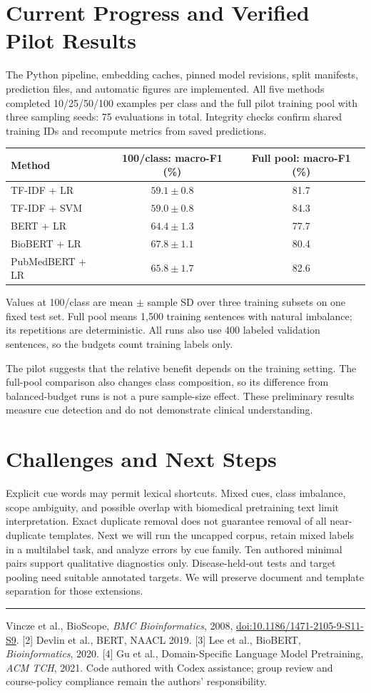 \documentclass[10pt,letterpaper]{article}
\begin{document}
\section{Current Progress and Verified Pilot Results}
The Python pipeline, embedding caches, pinned model revisions, split manifests,
prediction files, and automatic figures are implemented. All five methods completed
10/25/50/100 examples per class and the full pilot training pool with three sampling
seeds: 75 evaluations in total. Integrity checks confirm shared training IDs and
recompute metrics from saved predictions.
\begin{center}
\small
\begin{tabular}{lcc}
\toprule
Method & 100/class: macro-F1 (\%) & Full pool: macro-F1 (\%)\\
\midrule
TF-IDF + LR & $59.1\pm0.8$ & 81.7 \\
TF-IDF + SVM & $59.0\pm0.8$ & 84.3 \\
BERT + LR & $64.4\pm1.3$ & 77.7 \\
BioBERT + LR & $67.8\pm1.1$ & 80.4 \\
PubMedBERT + LR & $65.8\pm1.7$ & 82.6 \\
\bottomrule
\end{tabular}
\end{center}
\vspace{-6pt}
{\small Values at 100/class are mean $\pm$ sample SD over three training subsets on
one fixed test set. Full pool means 1,500 training sentences with natural imbalance;
its repetitions are deterministic. All runs also use 400 labeled validation sentences,
so the budgets count training labels only.}

The pilot suggests that the relative benefit depends on the training setting.
The full-pool comparison also changes class composition, so its difference from
balanced-budget runs is not a pure sample-size effect. These preliminary results
measure cue detection and do not demonstrate clinical understanding.
\section{Challenges and Next Steps}
Explicit cue words may permit lexical shortcuts. Mixed cues, class imbalance,
scope ambiguity, and possible overlap with biomedical pretraining text limit interpretation.
Exact duplicate removal does not guarantee removal of all near-duplicate templates.
Next we will run the uncapped corpus, retain mixed labels in a multilabel task,
and analyze errors by cue family. Ten authored minimal pairs support qualitative
diagnostics only. Disease-held-out tests and target pooling need suitable annotated
targets. We will preserve document and template separation for those extensions.
\vspace{3pt}
\hrule
\vspace{3pt}
{\fontsize{8}{9}\selectfont
[1] Vincze et al., BioScope, \emph{BMC Bioinformatics}, 2008,
\href{https://doi.org/10.1186/1471-2105-9-S11-S9}{doi:10.1186/1471-2105-9-S11-S9}.
[2] Devlin et al., BERT, NAACL 2019.
[3] Lee et al., BioBERT, \emph{Bioinformatics}, 2020.
[4] Gu et al., Domain-Specific Language Model Pretraining, \emph{ACM TCH}, 2021.
Code authored with Codex assistance; group review and course-policy compliance remain
the authors' responsibility.}
\end{document}
